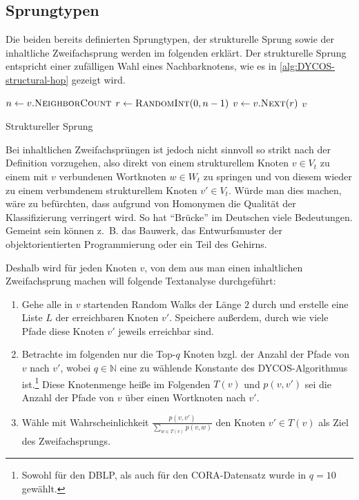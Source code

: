 \subsection{Sprungtypen}\label{sec:sprungtypen}
Die beiden bereits definierten Sprungtypen, der strukturelle Sprung
sowie der inhaltliche Zweifachsprung werden im folgenden erklärt.
\goodbreak
Der strukturelle Sprung entspricht einer zufälligen Wahl eines 
Nachbarknotens, wie es in \cref{alg:DYCOS-structural-hop}
gezeigt wird.
\begin{algorithm}[H]
    \begin{algorithmic}[1]
            \State $n \gets v.\Call{NeighborCount}{}$ 
            \State $r \gets \Call{RandomInt}{0, n-1}$ 
            \State $v \gets v.\Call{Next}{r}$ 
            \State \Return $v$
        \EndProcedure
    \end{algorithmic}
\caption{Struktureller Sprung}
\label{alg:DYCOS-structural-hop}
\end{algorithm}

Bei inhaltlichen Zweifachsprüngen ist jedoch nicht sinnvoll so strikt
nach der Definition vorzugehen,  also
direkt von einem strukturellem Knoten 
$v \in V_t$ zu einem mit $v$ verbundenen Wortknoten $w \in W_t$ zu springen
und von diesem wieder zu einem verbundenem strukturellem Knoten 
$v' \in V_t$. Würde man dies machen, wäre zu befürchten, dass
aufgrund von Homonymen die Qualität der Klassifizierung verringert
wird. So hat \enquote{Brücke} im Deutschen viele Bedeutungen.
Gemeint sein können z.~B. das Bauwerk, das Entwurfsmuster der
objektorientierten Programmierung oder ein Teil des Gehirns.

Deshalb wird für jeden Knoten $v$, von dem aus man einen inhaltlichen
Zweifachsprung machen will folgende Textanalyse durchgeführt:
\begin{enumerate}[label=C\arabic*,ref=C\arabic*]
    \item \label{step:c1} Gehe alle in $v$ startenden Random Walks der Länge $2$ durch
          und erstelle eine Liste $L$ der erreichbaren Knoten $v'$. Speichere
          außerdem, durch wie viele Pfade diese Knoten $v'$ jeweils erreichbar sind.
    \item \label{step:c2} Betrachte im folgenden nur die Top-$q$ Knoten bzgl. der
          Anzahl der Pfade von $v$ nach $v'$, wobei $q \in \mathbb{N}$
          eine zu wählende Konstante des DYCOS-Algorithmus ist.\footnote{Sowohl für den DBLP, als auch für den 
CORA-Datensatz wurde in \cite[S. 364]{aggarwal2011} $q=10$ gewählt.}
          Diese Knotenmenge heiße im Folgenden $T(v)$ und $p(v, v')$
          sei die Anzahl der Pfade von $v$ über einen Wortknoten nach $v'$.
    \item \label{step:c3} Wähle mit Wahrscheinlichkeit $\frac{p(v, v')}{\sum_{w \in T(v)} p(v, w)}$
          den Knoten $v' \in T(v)$ als Ziel des Zweifachsprungs.
\end{enumerate}

